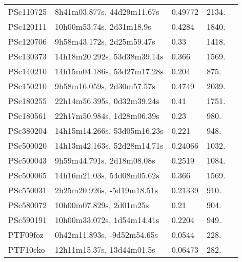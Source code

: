 \begin{longtable}{lllll}
        PSc110725 &     8h41m03.877s, 44d29m11.67s &  0.49772 &          2134. &    \citet{2016SDSSD.C...0000:} \\
        PSc120111 &       10h00m53.74s, 2d31m18.9s &   0.4284 &          1840. &    \citet{2007ApJS..172...70L} \\
        PSc120706 &      9h58m43.172s, 2d25m59.47s &     0.33 &          1418. &    \citet{2010ApJ...709..572K} \\
        PSc130373 &    14h18m20.292s, 53d38m39.14s &    0.366 &          1569. &    \citet{2005ApJS..158..161H} \\
        PSc140210 &    14h15m04.186s, 53d27m17.28s &    0.204 &           875. &    \citet{2005ApJS..158..161H} \\
        PSc150210 &      9h58m16.059s, 2d30m57.57s &   0.4749 &          2039. &    \citet{2007ApJS..172...70L} \\
        PSc180255 &     22h14m56.395s, 0d32m39.24s &     0.41 &          1751. &    \citet{2017AJ....153...53L} \\
        PSc180561 &     22h17m50.984s, 1d28m06.39s &     0.23 &           980. &    \citet{2014ApJ...795...44R} \\
        PSc380204 &    14h15m14.266s, 53d05m16.23s &    0.221 &           948. &    \citet{2005ApJS..158..161H} \\
        PSc500020 &    14h13m42.163s, 52d28m14.71s &  0.24066 &          1032. &    \citet{2004SDSS3.C...0000:} \\
        PSc500043 &      9h59m44.791s, 2d18m08.08s &   0.2519 &          1084. &    \citet{2007ApJS..172...70L} \\
        PSc500065 &     14h16m21.03s, 54d08m05.62s &    0.366 &          1569. &    \citet{2005ApJS..158..161H} \\
        PSc550031 &     2h25m20.926s, -5d19m18.51s &  0.21339 &           910. &    \citet{2008MNRAS.386..697R} \\
        PSc580072 &        10h00m07.829s, 2d01m25s &     0.21 &           904. &    \citet{2008ApJS..176...19F} \\
        PSc590191 &     10h00m33.072s, 1d54m14.41s &   0.2204 &           949. &    \citet{2007ApJS..172...70L} \\
         PTF09foz &     0h42m11.893s, -9d52m54.65s &   0.0544 &           228. &    \citet{2003SDSS1.C...0000:} \\
         PTF10cko &      12h11m15.37s, 13d44m01.5s &  0.06473 &           282. &    \citet{2005SDSS4.C...0000:} \\

\end{longtable}
